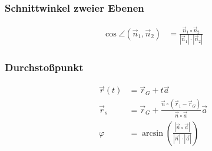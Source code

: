 \begin{multicols}{2}
\subsubsection*{Schnittwinkel zweier Ebenen}
\begin{align*} 
\cos\angle(\vec{n}_1,\vec{n}_2)&=\frac{\vec{n}_1\circ\vec{n}_2}{|\vec{n}_1|\cdot|\vec{n}_2|}
\end{align*}
\vfill
\subsubsection*{Durchstoßpunkt}
\begin{align*} 
\vec{r}(t) &=\vec{r}_G+t\vec{a}\\
\vec{r}_s&=\vec{r}_G+\frac{\vec{n}\circ\left(\vec{r}_1-\vec{r}_G\right)}{\vec{n}\circ\vec{a}}\vec{a}\\
\varphi&=\arcsin\left(\frac{|\vec{n}\circ\vec{a}|}{|\vec{n}|\cdot|\vec{a}|}\right)
\end{align*}
\vfill
\end{multicols}